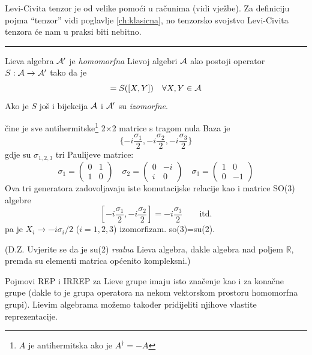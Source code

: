 Levi-Civita tenzor je od velike pomoći u računima (vidi vježbe).
Za definiciju pojma ``tenzor'' vidi poglavlje \ref{ch:klasicna}, no tenzorsko
svojstvo Levi-Civita tenzora će nam u praksi biti nebitno.

\rule{3cm}{0.5pt}

Lieva algebra $\mathcal{A}'$ je \emph{homomorfna} Lievoj algebri $\mathcal{A}$ ako postoji 
operator $S:\mathcal{A}\to\mathcal{A}'$ tako da je
\begin{displaymath}
       [S(X), S(Y)]=S([X,Y]) \quad \forall X, Y \in\calA
\end{displaymath}
Ako je $S$ još i bijekcija $\mathcal{A}$ i $\mathcal{A}'$ su \emph{izomorfne}.

\begin{primjer}
 čine je sve antihermitske\footnote{$A$ je antihermitska ako je $A^\dagger=-A$} 
2$\times$2 matrice s tragom nula Baza je 
\[
     \{ -i\frac{\sigma_1}{2},  -i\frac{\sigma_2}{2},  -i\frac{\sigma_3}{2} \}
\]
gdje su $\sigma_{1,2,3}$ tri Paulijeve matrice:
\begin{equation}
\sigma_1=\left( \begin{array}{cc} 0 &  1 \\ 1 & 0 \end{array} \right)
\quad
\sigma_2=\left( \begin{array}{cc} 0 & -i \\ i & 0 \end{array} \right)
\quad
\sigma_3=\left( \begin{array}{cc} 1 &  0 \\ 0 &-1 \end{array} \right)
\label{eq:PaulijeveMatrice}
\end{equation}
Ova tri generatora zadovoljavaju iste komutacijske relacije kao i matrice
SO(3) algebre
\begin{displaymath}
 \left[ -i\frac{\sigma_1}{2}, -i\frac{\sigma_2}{2} \right] =
 -i\frac{\sigma_3}{2} \qquad \text{itd.}
\end{displaymath}
pa je $X_i \to -i \sigma_i/2$ ($i=1,2,3$) izomorfizam.
so(3)=su(2).

(D.Z. Uvjerite se da je su(2) \emph{realna} Lieva algebra, dakle algebra
nad poljem $\mathbb{R}$, premda su elementi matrica općenito kompleksni.)
\end{primjer}

Pojmovi REP i IRREP za Lieve grupe imaju isto značenje kao i za
konačne grupe (dakle to je grupa operatora na nekom vektorskom prostoru
homomorfna grupi). Lievim algebrama možemo također pridijeliti
njihove vlastite reprezentacije.

